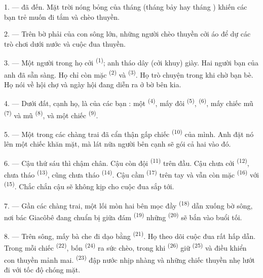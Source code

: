 1. ---  đã đến. Mặt trời nóng bỏng của tháng  (tháng bảy hay
tháng ) khiến các bạn trẻ muốn đi tắm và chèo thuyền.

2. --- Trên bờ phải của con sông lớn, những người chèo thuyền cởi áo để dự các trò chơi
dưới nước và cuộc đua thuyền.

3. --- Một người trong họ cởi  \textsuperscript{(1)}; anh tháo dây (cởi
khuy) giày. Hai người bạn của anh đã sẵn sàng. Họ chỉ còn mặc 
\textsuperscript{(2)} và  \textsuperscript{(3)}. Họ trò chuyện trong khi
chờ bạn bè. Họ nói về hội chợ và ngày hội đang diễn ra ở bờ bên kia.

4. --- Dưới đất, cạnh họ, là  của các bạn : một 
 \textsuperscript{(4)}, mấy đôi  \textsuperscript{(5)},
 \textsuperscript{(6)}, mấy chiếc mũ  \textsuperscript{(7)} và mũ
 \textsuperscript{(8)}, và một chiếc  \textsuperscript{(9)}.

5. --- Một trong các chàng trai đã cẩn thận gấp chiếc 
\textsuperscript{(10)} của mình. Anh đặt nó lên một chiếc khăn mặt, mà lát nữa người bên
cạnh sẽ gói cả hai  vào đó.

6. --- Cậu thứ sáu thì chậm chân. Cậu còn đội 
\textsuperscript{(11)} trên đầu. Cậu chưa cởi  \textsuperscript{(12)},
chưa tháo  \textsuperscript{(13)}, cũng chưa tháo 
\textsuperscript{(14)}. Cậu cầm  \textsuperscript{(17)} trên tay và vẫn
còn mặc  \textsuperscript{(16)} với 
\textsuperscript{(15)}. Chắc chắn cậu sẽ không kịp cho cuộc đua sắp tới.

7. --- Gần các chàng trai, một lối mòn hai bên mọc đầy 
\textsuperscript{(18)} dẫn xuống bờ sông, nơi bác Giacôbê đang chuẩn bị giữa đám
 \textsuperscript{(19)} những  \textsuperscript{(20)} sẽ
bắn vào buổi tối.

\VUsaut{4.4mm}
\VUsaut{3.4mm}

8. --- Trên sông, mấy bà che  đi dạo bằng 
\textsuperscript{(21)}. Họ theo dõi cuộc đua rất hấp dẫn. Trong mỗi chiếc  \textsuperscript{(22)}, bốn  \textsuperscript{(24)} ra sức chèo,
trong khi  \textsuperscript{(26)} giữ 
\textsuperscript{(25)} và điều khiển con thuyền mảnh mai. 
\textsuperscript{(23)} đập nước nhịp nhàng và những chiếc thuyền nhẹ lướt đi với tốc độ
chóng mặt.

